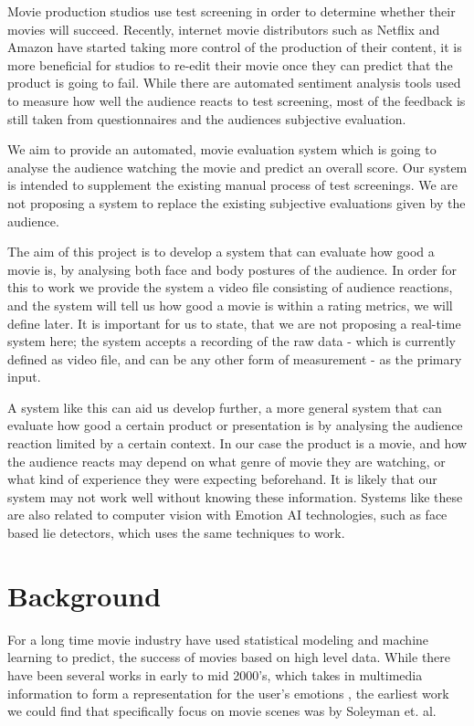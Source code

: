 \documentclass[12pt,a4paper,man]{report}
\begin{document}
Movie production studios use test screening in order to determine whether their movies will succeed. Recently, internet movie distributors such as Netflix and Amazon have started taking more control of the production of their content, it is more beneficial for studios to re-edit their movie once they can predict that the product is going to fail. While there are automated sentiment analysis tools used to measure how well the audience reacts to test screening, most of the feedback is still taken from questionnaires and the audiences subjective evaluation.

We aim to provide an automated, movie evaluation system which is going to analyse the audience watching the movie and predict an overall score. Our system is intended to supplement the existing manual process of test screenings. We are not proposing a system to replace the existing subjective evaluations given by the audience.

The aim of this project is to develop a system that can evaluate how good a movie is, by analysing both face and body postures of the audience. In order for this to work we provide the system a video file consisting of audience reactions, and the system will tell us how good a movie is within a rating metrics, we will define later. It is important for us to state, that we are not proposing a real-time system here; the system accepts a recording of the raw data - which is currently defined as video file, and can be any other form of measurement - as the primary input.

A system like this can aid us develop further, a more general system that can evaluate how good a certain product or presentation is by analysing the audience reaction limited by a certain context. In our case the product is a movie, and how the audience reacts may depend on what genre of movie they are watching, or what kind of experience they were expecting beforehand. It is likely that our system may not work well without knowing these information. Systems like these are also related to computer vision with Emotion AI technologies, such as face based lie detectors, which uses the same techniques to work.

\chapter{Background}
\label{sec:org48494f5}
For a long time movie industry have used statistical modeling and machine learning to predict, the success of movies based on high level data. While there have been several works in early to mid 2000’s, which takes in multimedia information to form a representation for the user’s emotions \cite{Shiliang_Zhang_2008,wu2008interactive}, the earliest work we could find that specifically focus on movie scenes was by Soleyman et. al.
\end{document}
